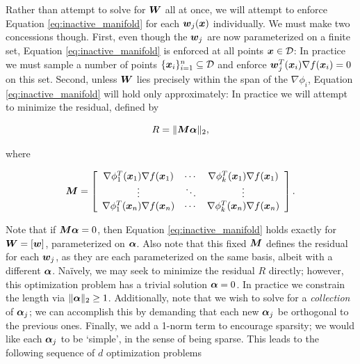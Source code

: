 \documentclass[]{aiaa-tc}%
\newcommand{\dom}{\mathcal{D}}
\begin{document}
Rather than attempt to solve for $\boldsymbol{W}$ all at once, we will attempt to enforce Equation \ref{eq:inactive_manifold} for each $\boldsymbol{w}_j(\boldsymbol{x})$ individually. We must make two concessions though. First, even though the $\boldsymbol{w}_j$ are now parameterized on a finite set, Equation \ref{eq:inactive_manifold} is enforced at all points $\vx\in\dom$: In practice we must sample a number of points $\{\vx_i\}_{i=1}^n\subseteq\dom$ and enforce $\boldsymbol{w}_j^T(\boldsymbol{x}_i)\nabla f(\boldsymbol{x}_i)=0$ on this set. Second, unless $\boldsymbol{W}$ lies precisely within the span of the $\nabla\phi_i$, Equation \ref{eq:inactive_manifold} will hold only approximately: In practice we will attempt to minimize the residual, defined by
\nomenclature{$n$}{Number of sample points in $\dom$}%

\begin{equation}
\label{eq:residual}
R = \|\boldsymbol{M}\boldsymbol{\alpha}\|_2,
\end{equation}

where

\begin{equation}
\label{eq:matrix_m}
\mM = \left[\begin{array}{ccc}%
    \nabla\phi_1^T(\vx_1)\nabla f(\vx_1) & \cdots & \nabla\phi_k^T(\vx_1)\nabla f(\vx_1) \\
    \vdots & \ddots & \vdots \\
    \nabla\phi_1^T(\vx_n)\nabla f(\vx_n) & \cdots & \nabla\phi_k^T(\vx_n)\nabla f(\vx_n) \\
    \end{array}\right].
\end{equation}

Note that if $\boldsymbol{M}\boldsymbol{\alpha}=0$, then Equation \ref{eq:inactive_manifold} holds exactly for $\boldsymbol{W}=[\boldsymbol{w}]$, parameterized on $\boldsymbol{\alpha}$. Also note that this fixed $\boldsymbol{M}$ defines the residual for each $\boldsymbol{w}_j$, as they are each parameterized on the same basis, albeit with a different $\boldsymbol{\alpha}$. Na{\"i}vely, we may seek to minimize the residual $R$ directly; however, this optimization problem has a trivial solution $\boldsymbol{\alpha}=0$. In practice we constrain the length via $\|\boldsymbol{\alpha}\|_2\geq1$. Additionally, note that we wish to solve for a \emph{collection} of $\boldsymbol{\alpha}_j$; we can accomplish this by demanding that each new $\boldsymbol{\alpha}_j$ be orthogonal to the previous ones. Finally, we add a 1-norm term to encourage sparsity; we would like each $\boldsymbol{\alpha}_j$ to be `simple', in the sense of being sparse. This leads to the following sequence of $d$ optimization problems
%
\end{document}
